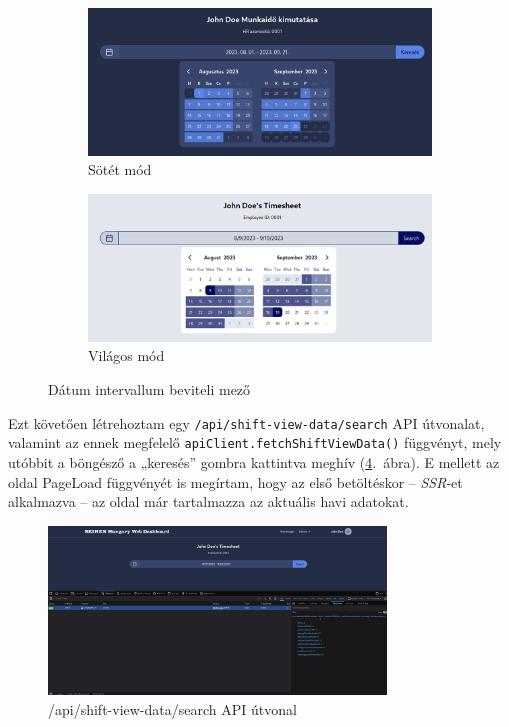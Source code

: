\documentclass[a4paper]{article}
\newcommand{\inltxt}[1]{\texttt{#1}}
\begin{document}
\begin{figure}[ht]
    \centering
    \begin{subfigure}[b]{0.45\textwidth}
        \centering
        \includegraphics[clip, trim=25 0 25 0, width=1\textwidth]{images/calendar-dark.png}
        \caption{Sötét mód}
        \label{fig:calendar_dark}
    \end{subfigure}
    \hfill
    \begin{subfigure}[b]{0.45\textwidth}
        \centering
        \includegraphics[clip, trim=25 0 25 0, width=1\textwidth]{images/calendar-light.png}
        \caption{Világos mód}
        \label{fig:calendar_light}
    \end{subfigure}
    \caption{Dátum intervallum beviteli mező}
    \label{fig:calendars}
\end{figure}

Ezt követően létrehoztam egy \inltxt{/api/shift-view-data/search} API útvonalat, valamint az ennek
megfelelő \inltxt{apiClient.fetchShiftViewData()} függvényt, mely utóbbit a böngésző a „keresés”
gombra kattintva meghív (\ref{fig:timesheet_search}.~ábra). E mellett az oldal PageLoad függvényét is megírtam, hogy az első
betöltéskor -- \emph{SSR}-et alkalmazva -- az oldal már tartalmazza az aktuális havi adatokat.

\begin{figure}[ht]
  \centering
  \includegraphics[width = 0.8\textwidth]{images/timesheet_search.png}
  \caption{/api/shift-view-data/search API útvonal}
  \label{fig:timesheet_search}
\end{figure}
\end{document}
